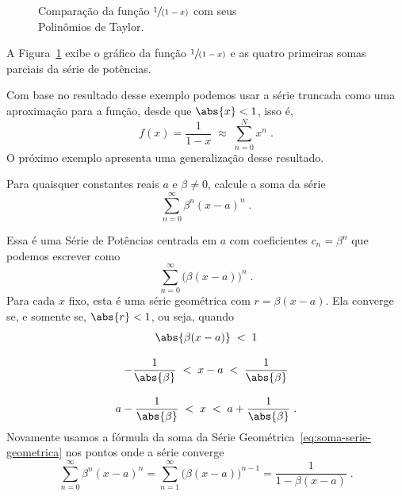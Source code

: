 \begin{figure}
  \begin{center}%
    \scalebox{0.9}{}%
    \vspace{-\baselineskip}%
  \end{center}
  \caption{Comparação da função \(\sfrac{1}{(1-x)}\) com seus\\Polinômios de Taylor.}
  \label{fig:funcao_tayplor_1div1mx}
\end{figure}

A Figura~\ref{fig:funcao_tayplor_1div1mx} exibe o gráfico da função
\(
  \sfrac{1}{(1-x)}
\)
e as quatro primeiras somas parciais da série de potências.

Com base no resultado desse exemplo podemos usar a série truncada como uma
aproximação para a função, desde que $\abs{x}<1$, isso é,
\[
	f(x) = \frac{1}{1-x} \;\approx\; \sum_{n=0}^{N} x^n   \;.
\]
O próximo exemplo apresenta uma generalização desse resultado.

\begin{example}
  Para quaisquer constantes reais $a$ e $\beta\neq 0$, calcule a soma da série
  \[
    \sum_{n=0}^\infty \beta^n(x-a)^n   \;.
  \]

  \solution
  Essa é uma Série de Potências centrada em $a$ com coeficientes $c_n=\beta^n$
  que podemos escrever como
  \[
  	\sum_{n=0}^\infty \big(\beta(x-a)\big)^n   \;.
 	\]
  Para cada $x$ fixo, esta é uma série geométrica com $r=\beta(x-a)$.
  Ela converge se, e somente se, $\abs{r}<1$, ou seja, quando
  \begin{gather*}
  	\abs{\beta(x-a)}        \;<\; 1                                     \\[3mm]
  	-\frac{1}{\abs{\beta}}  \;<\;  x-a  \;<\; \frac{1}{\abs{\beta}}     \\[3mm]
  	a-\frac{1}{\abs{\beta}} \;<\;  x    \;<\; a + \frac{1}{\abs{\beta}}   \;.
  \end{gather*}
  Novamente usamos a fórmula da
  soma da Série Geométrica~\eqref{eq:soma-serie-geometrica}
  nos pontos onde a série converge
  \[
    \sum_{n=0}^\infty \beta^n(x-a)^n =
    \sum_{n=1}^\infty \big(\beta(x-a)\big)^{n-1} =
    \frac{1}{1-\beta(x-a)}   \;.
  \]
\end{example}

